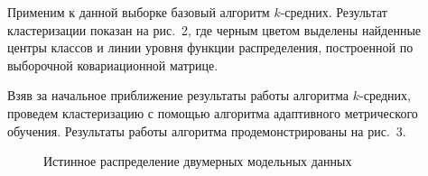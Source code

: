 Применим к данной выборке базовый алгоритм $k$-средних.
Результат кластеризации показан на рис.~2, где черным цветом выделены найденные центры классов и линии уровня функции распределения, построенной по выборочной ковариационной матрице.

Взяв за начальное приближение результаты работы алгоритма $k$-средних,
проведем клас\-те\-ри\-за\-цию с помощью алгоритма адаптивного метрического обучения.
Результаты работы алгоритма продемонстрированы на рис.~$3$.
\begin{figure}[ht]
    \caption{Истинное распределение двумерных модельных данных}
\end{figure}

